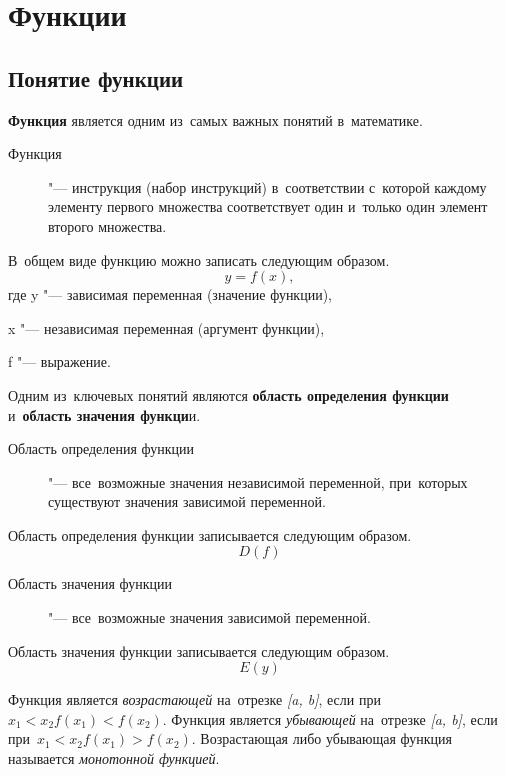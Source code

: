 \documentclass[]{scrartcl}
\begin{document}
\section{Функции}
\subsection{Понятие функции}
\textbf{Функция} является одним из~самых важных понятий в~математике.
\begin{description}
	\item[Функция] "--- инструкция (набор инструкций) в~соответствии с~которой каждому элементу первого множества соответствует один и~только один элемент второго множества.
\end{description}
В~общем виде функцию можно записать следующим образом.
\begin{equation}\label{function}
y=f(x),
\end{equation}
где y "--- зависимая переменная (значение функции),

x "--- независимая переменная (аргумент функции),

f "--- выражение.

Одним из~ключевых понятий являются \textbf{область определения функции} и~\textbf{область значения функци}и.
\begin{description}
	\item[Область определения функции] "--- все~возможные значения независимой переменной, при~которых существуют значения зависимой переменной.
\end{description}
Область определения функции записывается следующим образом.
\begin{equation}\label{eq:function-domain}
D(f)
\end{equation}
\begin{description}
	\item[Область значения функции] "--- все~возможные значения зависимой переменной.
\end{description}
Область значения функции записывается следующим образом.
\begin{equation}\label{eq:function-exists}
E(y)
\end{equation}

Функция является \emph{возрастающей} на~отрезке \textit{[a, b]}, если при~$x_1 < x_2 f(x_1) < f(x_2)$. Функция является \emph{убывающей} на~отрезке \textit{[a, b]}, если при~$x_1 < x_2 f(x_1) > f(x_2)$. Возрастающая либо убывающая функция называется \emph{монотонной функцией}.
\end{document}
